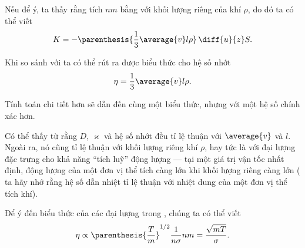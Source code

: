 Nếu để ý, ta thấy rằng tích $n m$ bằng với khối lượng riêng của khí $\rho$, do đó ta có thể viết
\begin{equation*}
    K = -\parenthesis{\frac{1}{3} \average{v} l \rho}\,\diff{u}{z} S.
\end{equation*}

\noindent
Khi so sánh với  ta có thể rút ra được biểu thức cho hệ số nhớt
\begin{equation}\label{eq:16_30}
    \eta = \frac{1}{3} \average{v} l \rho.
\end{equation}

\noindent
Tính toán chi tiết hơn sẽ dẫn đến cùng một biểu thức, nhưng với một hệ số chính xác hơn.

Có thể thấy từ  rằng $D$, $\varkappa$ và hệ số nhớt đều tỉ lệ thuận với $\average{v}$ và $l$. Ngoài ra, nó cũng tỉ lệ thuận với khối lượng riêng khí $\rho$, hay tức là với đại lượng đặc trưng cho khả năng ``tích luỹ'' động lượng --- tại một giá trị vận tốc nhất định, động lượng của một đơn vị thể tích càng lớn khi khối lượng riêng càng lớn ( ta hãy nhớ rằng hệ số dẫn nhiệt tỉ lệ thuận với nhiệt dung của một đơn vị thể tích khí).

Để ý đến biểu thức của các đại lượng trong , chúng ta có thể viết
\begin{equation*}
    \eta \propto \parenthesis{\frac{T}{m}}^{1/2} \frac{1}{n\sigma} n m = \frac{\sqrt{mT}}{\sigma}.
\end{equation*}


